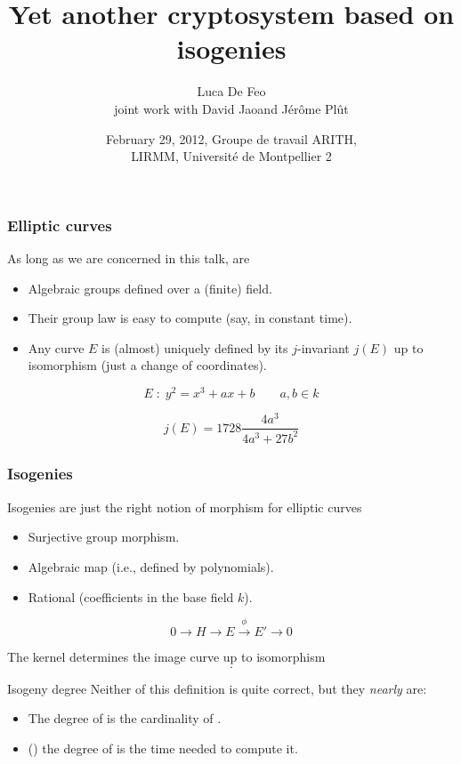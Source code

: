 \documentclass{beamer}
\title{Yet another cryptosystem based on isogenies}
\author[Luca De Feo]{Luca De Feo\footnotemark[1]\\
  joint work with David Jao\footnotemark[2] and Jérôme Plût\footnotemark[1]}
\date[Montpellier, February 29, 2012]{February 29, 2012, Groupe de travail ARITH,\\
  LIRMM, Université de Montpellier 2}
\institute[UVSQ]{\footnotemark[1]Université de Versailles -- Saint-Quentin-en-Yvelines,\\
  \footnotemark[2]University of Waterloo}
\renewcommand{\emph}[1]{}
\begin{document}
\frame{\titlepage}


\begin{frame}
  \frametitle{Elliptic curves}

  As long as we are concerned in this talk, \emph{elliptic curves} are

  \begin{itemize}
  \item Algebraic \alert{groups} defined over a (finite) field.
  \item Their group law is easy to compute (say, in constant time).
  \item Any curve $E$ is (almost) uniquely defined by its
    \alert{$j$-invariant} $j(E)$ up to isomorphism (just a change of
    coordinates).
  \end{itemize}
  
  \[E \;:\; y^2 = x^3 + ax + b \qquad a,b\in k\]

  \alert{\[j(E) = 1728\frac{4a^3}{4a^3+27b^2}\]}
  
\end{frame}


\begin{frame}
  \frametitle{Isogenies}

  Isogenies are just \alert{the right notion of morphism} for elliptic
  curves

  \begin{itemize}
  \item Surjective group morphism.
  \item Algebraic map (i.e., defined by polynomials).
  \item Rational (coefficients in the base field $k$).
  \end{itemize}

  \alert{\[0 \to H \to E \overset{\phi}{\to} E' \to 0\]}

  The kernel \emph{$H$} determines the image curve \emph{$E'$} up to
  isomorphism \[\emph{E/H\overset{\text{\tiny def}}{=}E'}.\]

  \begin{block}{Isogeny degree}
    Neither of this definition is quite correct, but they
    \textit{nearly} are:
    \begin{itemize}
    \item The degree of \emph{$\phi$} is the cardinality of \emph{$\ker\phi$}.
    \item (\emph{Bisson}) the degree of \emph{$\phi$} is the time
      needed to compute it.
    \end{itemize}
  \end{block}
\end{frame}
\end{document}
